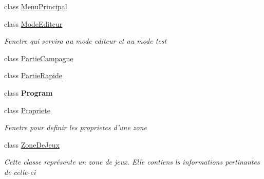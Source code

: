 \begin{DoxyCompactItemize}
class \hyperlink{class_interface_graphique_1_1_menu_principal}{Menu\-Principal}
\item 
class \hyperlink{class_interface_graphique_1_1_mode_editeur}{Mode\-Editeur}
\begin{DoxyCompactList}\small\item\em Fenetre qui servira au mode editeur et au mode test \end{DoxyCompactList}\item 
class \hyperlink{class_interface_graphique_1_1_partie_campagne}{Partie\-Campagne}
\item 
class \hyperlink{class_interface_graphique_1_1_partie_rapide}{Partie\-Rapide}
\item 
class {\bfseries Program}
\item 
class \hyperlink{class_interface_graphique_1_1_propriete}{Propriete}
\begin{DoxyCompactList}\small\item\em Fenetre pour definir les proprietes d'une zone \end{DoxyCompactList}\item 
class \hyperlink{class_interface_graphique_1_1_zone_de_jeux}{Zone\-De\-Jeux}
\begin{DoxyCompactList}\small\item\em Cette classe représente un zone de jeux. Elle contiens ls informations pertinantes de celle-\/ci \end{DoxyCompactList}\end{DoxyCompactItemize}
